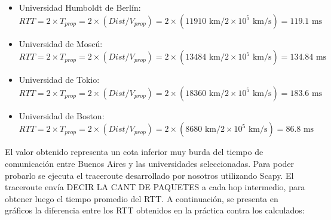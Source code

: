 \begin{itemize}
 \item Universidad Humboldt de Berlín:
\begin{equation}
 	RTT = 2 \times T_{prop} = 2 \times (Dist / V_{prop}) = 2 \times (11910 \text{ km} / 2\times10^5 \text{ km/s}) = 119.1  \text{ ms}
\end{equation}

 \item Universidad de Moscú:
 \begin{equation}
 	RTT = 2 \times T_{prop} = 2 \times (Dist / V_{prop}) = 2 \times (13484 \text{ km} / 2\times10^5 \text{ km/s}) = 134.84 \text{ ms}
 \end{equation}

 \item Universidad de Tokio:
 \begin{equation}
 	RTT = 2 \times T_{prop} = 2 \times (Dist / V_{prop}) = 2 \times (18360  \text{ km} / 2\times10^5 \text{ km/s}) = 183.6 \text{ ms}
 \end{equation}

 \item Universidad de Boston:
 \begin{equation}
 	RTT = 2 \times T_{prop} = 2 \times (Dist / V_{prop}) = 2 \times (8680 \text{ km} / 2\times10^5 \text{ km/s}) = 86.8 \text{ ms}
 \end{equation}

\end{itemize}

El valor obtenido representa un cota inferior muy burda del tiempo de comunicación entre Buenos Aires y las universidades seleccionadas. Para poder probarlo se ejecuta el traceroute desarrollado por nosotros utilizando Scapy. El traceroute envía DECIR LA CANT DE PAQUETES a cada hop intermedio, para obtener luego el tiempo promedio del RTT. A continuación, se presenta en gráficos la diferencia entre los RTT obtenidos en la práctica contra los calculados:




